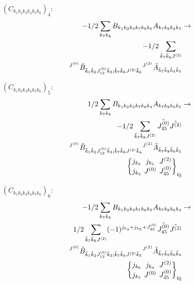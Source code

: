 \documentclass[11pt]{article}
\newcommand{\sixj}[6]{\begingroup\setlength{\arraycolsep}{0.2em}\begin{Bmatrix} #1 & #2 & #3 \\ #4 & #5 & #6 \end{Bmatrix}_{\text{6j}}\endgroup}
\begin{document}
$\left({C}_{{k}_{1}{k}_{2}{k}_{3}{k}_{4}{k}_{5}{k}_{6}}\right)_{4}$:
\begin{align}
-1/2\sum_{{k}_{7}{k}_{8}}{B}_{{k}_{1}{k}_{2}{k}_{3}{k}_{7}{k}_{8}{k}_{6}}{A}_{{k}_{7}{k}_{8}{k}_{4}{k}_{5}}&\rightarrow \notag \\-1/2\sum_{\tilde{k}_{7}\tilde{k}_{8}J^{(2)}}& \notag \\{}^{J^{(0)}}\tilde{B}_{\tilde{k}_{1}\tilde{k}_{2}J^{(0)}_{12}\tilde{k}_{3};\tilde{k}_{7}\tilde{k}_{8}J^{(2)}\tilde{k}_{6}}{}^{J^{(2)}}\tilde{A}_{\tilde{k}_{7}\tilde{k}_{8}\tilde{k}_{4}\tilde{k}_{5}}& \notag \\
\end{align}

$\left({C}_{{k}_{1}{k}_{2}{k}_{3}{k}_{4}{k}_{5}{k}_{6}}\right)_{5}$:
\begin{align}
1/2\sum_{{k}_{7}{k}_{8}}{B}_{{k}_{1}{k}_{2}{k}_{3}{k}_{7}{k}_{8}{k}_{4}}{A}_{{k}_{7}{k}_{8}{k}_{6}{k}_{5}}&\rightarrow \notag \\-1/2\sum_{\tilde{k}_{7}\tilde{k}_{8}J^{(2)}}\hat{J^{(0)}_{45}}\hat{J^{(2)}}& \notag \\{}^{J^{(0)}}\tilde{B}_{\tilde{k}_{1}\tilde{k}_{2}J^{(0)}_{12}\tilde{k}_{3};\tilde{k}_{7}\tilde{k}_{8}J^{(2)}\tilde{k}_{4}}{}^{J^{(2)}}\tilde{A}_{\tilde{k}_{7}\tilde{k}_{8}\tilde{k}_{6}\tilde{k}_{5}}& \notag \\\sixj{j_{{k}_{6}}}{j_{{k}_{5}}}{J^{(2)}}{j_{{k}_{4}}}{J^{(0)}}{J^{(0)}_{45}}
\end{align}

$\left({C}_{{k}_{1}{k}_{2}{k}_{3}{k}_{4}{k}_{5}{k}_{6}}\right)_{6}$:
\begin{align}
-1/2\sum_{{k}_{7}{k}_{8}}{B}_{{k}_{1}{k}_{2}{k}_{3}{k}_{7}{k}_{8}{k}_{5}}{A}_{{k}_{7}{k}_{8}{k}_{6}{k}_{4}}&\rightarrow \notag \\1/2\sum_{\tilde{k}_{7}\tilde{k}_{8}J^{(2)}}(-1)^{j_{{k}_{4}} +j_{{k}_{5}} +J^{(0)}_{45} }\hat{J^{(0)}_{45}}\hat{J^{(2)}}& \notag \\{}^{J^{(0)}}\tilde{B}_{\tilde{k}_{1}\tilde{k}_{2}J^{(0)}_{12}\tilde{k}_{3};\tilde{k}_{7}\tilde{k}_{8}J^{(2)}\tilde{k}_{5}}{}^{J^{(2)}}\tilde{A}_{\tilde{k}_{7}\tilde{k}_{8}\tilde{k}_{6}\tilde{k}_{4}}& \notag \\\sixj{j_{{k}_{6}}}{j_{{k}_{4}}}{J^{(2)}}{j_{{k}_{5}}}{J^{(0)}}{J^{(0)}_{45}}
\end{align}
\end{document}
